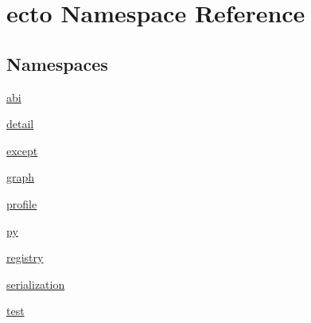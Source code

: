 \hypertarget{namespaceecto}{}\section{ecto Namespace Reference}
\label{namespaceecto}
\subsection*{Namespaces}
\begin{DoxyCompactItemize}
\item 
 \hyperlink{namespaceecto_1_1abi}{abi}
\item 
 \hyperlink{namespaceecto_1_1detail}{detail}
\item 
 \hyperlink{namespaceecto_1_1except}{except}
\item 
 \hyperlink{namespaceecto_1_1graph}{graph}
\item 
 \hyperlink{namespaceecto_1_1profile}{profile}
\item 
 \hyperlink{namespaceecto_1_1py}{py}
\item 
 \hyperlink{namespaceecto_1_1registry}{registry}
\item 
 \hyperlink{namespaceecto_1_1serialization}{serialization}
\item 
 \hyperlink{namespaceecto_1_1test}{test}
\end{DoxyCompactItemize}
